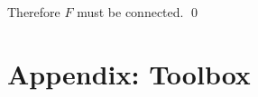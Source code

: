 \documentclass[12pt]{article}
\newtheorem{theorem}{Theorem}
\newtheorem{definition}{Definition}
\begin{document}
Therefore $F$ must be connected.
\qed

\newpage
\appendix
\section*{Appendix: Toolbox}

%
\end{document}
